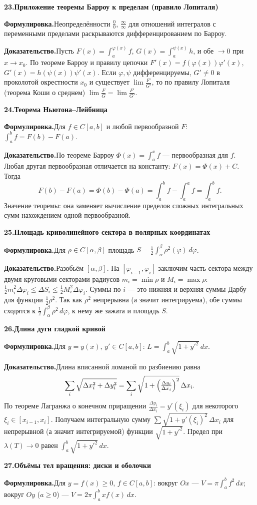 \documentclass[10pt,a4paper]{article}
\newcommand{\dx}{\,dx}
\renewcommand{\le}{\leqslant}
\renewcommand{\ge}{\geqslant}
\theoremstyle{definition}
\theoremstyle{plain}
\newcommand{\writespace}{\vspace{7.5mm}}
\newcommand{\prf}[2]{%
  \par\writespace\noindent
  {\large\bfseries\color{accent}#1.\enspace #2}\par\smallskip}
\newcommand{\stmt}{\par\noindent\textbf{Формулировка.}\enspace}
\newcommand{\dok}{\par\noindent\textbf{Доказательство.}\enspace}
\begin{document}
\prf{23}{Приложение теоремы Барроу к пределам (правило Лопиталя)}
\stmt Неопределённости $\tfrac00$, $\tfrac\infty\infty$ для отношений интегралов с переменными
пределами раскрываются дифференцированием по Барроу.

\dok Пусть $F(x)=\int_{a}^{\varphi(x)}f$, $G(x)=\int_{a}^{\psi(x)}h$, и обе $\to0$ при $x\to x_0$.
По теореме Барроу и правилу цепочки $F'(x)=f(\varphi(x))\varphi'(x)$,
$G'(x)=h(\psi(x))\psi'(x)$. Если $\varphi,\psi$ дифференцируемы, $G'\ne0$ в проколотой окрестности
$x_0$ и существует $\lim\tfrac{F'}{G'}$, то по правилу Лопиталя (теорема Коши о среднем)
$\lim\tfrac FG=\lim\tfrac{F'}{G'}$.

\prf{24}{Теорема Ньютона–Лейбница}
\stmt Для $f\in C[a,b]$ и любой первообразной $F$: $\int_a^b f=F(b)-F(a)$.

\dok По теореме Барроу $\Phi(x)=\int_a^x f$ — первообразная для $f$. Любая другая первообразная
отличается на константу: $F(x)=\Phi(x)+C$. Тогда
\[
  F(b)-F(a)=\Phi(b)-\Phi(a)=\int_a^b f-\int_a^a f=\int_a^b f .
\]
Значение теоремы: она заменяет вычисление пределов сложных интегральных сумм нахождением одной
первообразной.

\prf{25}{Площадь криволинейного сектора в полярных координатах}
\stmt Для $\rho\in C[\alpha,\beta]$ площадь $S=\tfrac12\int_\alpha^\beta\rho^2(\varphi)\,d\varphi$.

\dok Разобьём $[\alpha,\beta]$. На $[\varphi_{i-1},\varphi_i]$ заключим часть сектора между двумя
круговыми секторами радиусов $m_i=\min\rho$ и $M_i=\max\rho$:
$\tfrac12 m_i^2\Delta\varphi_i\le\Delta S_i\le\tfrac12 M_i^2\Delta\varphi_i$. Суммы по $i$ —
это нижняя и верхняя суммы Дарбу для функции $\tfrac12\rho^2$. Так как $\rho^2$ непрерывна (а значит
интегрируема), обе суммы сходятся к $\tfrac12\int_\alpha^\beta\rho^2\,d\varphi$, к нему же зажата и
площадь $S$.

\prf{26}{Длина дуги гладкой кривой}
\stmt Для $y=y(x)$, $y'\in C[a,b]$: $L=\int_a^b\sqrt{1+y'^2}\dx$.

\dok Длина вписанной ломаной по разбиению равна
\[
  \sum_i\sqrt{\Delta x_i^2+\Delta y_i^2}=\sum_i\sqrt{1+\Bigl(\tfrac{\Delta y_i}{\Delta x_i}\Bigr)^2}\,
  \Delta x_i .
\]
По теореме Лагранжа о конечном приращении $\tfrac{\Delta y_i}{\Delta x_i}=y'(\xi_i)$ для некоторого
$\xi_i\in[x_{i-1},x_i]$. Получаем интегральную сумму
$\sum\sqrt{1+y'(\xi_i)^2}\,\Delta x_i$ для непрерывной (а значит интегрируемой) функции
$\sqrt{1+y'^2}$. Предел при $\lambda(T)\to0$ равен $\int_a^b\sqrt{1+y'^2}\dx$.

\prf{27}{Объёмы тел вращения: диски и оболочки}
\stmt Для $y=f(x)\ge0$, $f\in C[a,b]$: вокруг $Ox$ — $V=\pi\int_a^b f^2\dx$; вокруг $Oy$ ($a\ge0$) —
$V=2\pi\int_a^b x f(x)\dx$.
\end{document}
